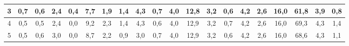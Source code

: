 \begin{sidewaystable}[]
\begin{tabular}{|c|c|c|c|c|c|c|c|c|c|c|c|c|c|c|c|c|c|c|c|}
    3  & 0,7                                             & 0,6                                             & 2,4                                             & 0,4                                             & 7,7                                              & 1,9                                              & 1,4                                              & 4,3                                              & 0,7                                              & 4,0                                              & 12,8                                             & 3,2                                              & 0,6                                              & 4,2                                              & 2,6                                              & 16,0                                             & 61,8                                             & 3,9                                              & 0,8                                              \\ \hline
    4  & 0,5                                             & 0,5                                             & 2,4                                             & 0,0                                             & 9,2                                              & 2,3                                              & 1,4                                              & 4,3                                              & 0,6                                              & 4,0                                              & 12,9                                             & 3,2                                              & 0,7                                              & 4,2                                              & 2,6                                              & 16,0                                             & 69,3                                             & 4,3                                              & 1,4                                              \\ \hline
    5  & 0,5                                             & 0,6                                             & 3,0                                             & 0,0                                             & 8,7                                              & 2,2                                              & 0,9                                              & 3,0                                              & 0,7                                              & 4,0                                              & 12,9                                             & 3,2                                              & 0,6                                              & 4,2                                              & 2,6                                              & 16,0                                             & 68,6                                             & 4,3                                              & 1,1                                              \\ \hline

\end{tabular}
\end{sidewaystable}
